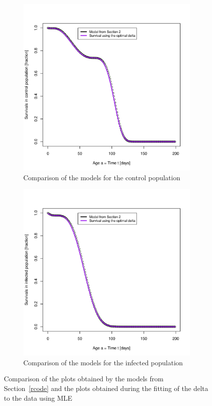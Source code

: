 \documentclass[10pt]{article}         %
\begin{document}
\begin{figure}[h]
\begin{subfigure}[b]{0.5\textwidth}
    \includegraphics[width=\textwidth]{Comparison_of_models_control.pdf}
    \caption{Comparison of the models for the control population}
    \label{fig:subfigure_3}
  \end{subfigure}
  \begin{subfigure}[b]{0.5\textwidth}
    \includegraphics[width=\textwidth]{Comparison_of_models_infecteds.pdf}
    \caption{Comparison of the models for the infected population}
    \label{fig:subfigure_4}
  \end{subfigure}
\caption{Comparison of the plots obtained by the models from Section~\ref{rcode} and the plots obtained during the fitting of the delta to the data using MLE}
	\label{fig:comparison_survival_curve}
\end{figure}
\end{document}
